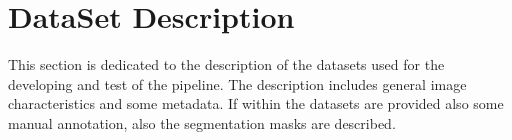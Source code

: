 \documentclass{standalone}
\begin{document}
	\section{DataSet Description}
	
	This section is dedicated to the description of the datasets used for the developing and test of the pipeline. The description includes general image characteristics and some metadata. If within the datasets are provided also some manual annotation, also the segmentation masks are described. 
\end{document}
